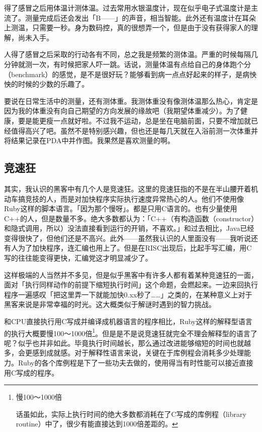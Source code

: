 \documentclass[a4paper,12pt]{article}
\begin{document}
得了感冒之后用体温计测体温。过去常用水银温度计，现在似乎电子式温度计是主流了。测量完成后还会发出「B——」的声音，相当智能。此外还有温度计在耳朵上测温，只需要一秒。身为数码控，真的很想弄一个，但是由于没有获得家人的理解，尚未入手。

人得了感冒之后采取的行动各有不同，总之我是频繁的测体温。严重的时候每隔几分钟就测一次，有时候把家人吓一跳。话说，测量体温有点给自己的身体跑个分（benchmark）的感觉，是不是很好玩？能够看到病一点点好起来的样子，是病怏怏的时候的少数的乐趣了。

要说在日常生活中的测量，还有测体重。我测体重没有像测体温那么热心，肯定是因为我的体重没有向自己期望的方向发展的缘故吧（我期望体重减少）。为了健康，要是能更瘦一点就好啦。不过我不运动，总是坐在电脑前面，只要不增加就已经值得高兴了吧。虽然不是特别感兴趣，但也还是每几天就在入浴前测一次体重并将结果记录在PDA中并作图。我果然是喜欢测量的啊。

\subsection{竞速狂}

其实，我认识的黑客中有几个人是竞速狂。这里的竞速狂指的不是在半山腰开着机动车搞竞技的人，而是对加快程序实际执行速度异常热心的人。他们不使用像Ruby这样的脚本语言。「因为那个慢呀」。都是只用C语言的。也有少量使用C++的人，但是数量不多。绝大多数都认为：「C++（有构造函数（constructor）和隐式调用，所以）没法直接看到运行的开销，不喜欢。」和过去相比，Java已经变得很快了，但他们还是不高兴。此外——虽然我认识的人里面没有——我听说还有人为了加快程序，连汇编也用上了。但是在RISC出现后，比起手写汇编，用C写的往往能变得更快，汇编党这才明显减少了。

这样极端的人当然并不多见，但是似乎黑客中有许多人都有着某种竞速狂的一面，面对「执行同样动作的前提下缩短执行时间」这个命题，会燃起来。一边来回执行程序一遍感叹「把这里弄一下就能加快0.xx秒了……」之类的，在某种意义上对于黑客来说是非常幸福的时光。这大概类似于解谜时遇到的智力挑战。

和CPU直接执行用C写成并编译成机器语言的程序相比，Ruby这样的解释型语言的执行大概要慢100～1000倍\footnote{慢100～1000倍

话虽如此，实际上执行时间的绝大多数都消耗在了C写成的库例程（library routine）中了，很少有能直接达到1000倍差距的。}。但是是不是说竞速狂就完全不理会解释型的语言了呢？似乎也并非如此。毕竟执行时间越长，那么通过改进能够缩短的时间也就越多，会更感到成就感。对于解释性语言来说，关键在于库例程会消耗多少处理能力。Ruby的各个库例程是下了一些功夫去做的，使用得当有时性能可以接近直接用C写成的程序。
\end{document}
